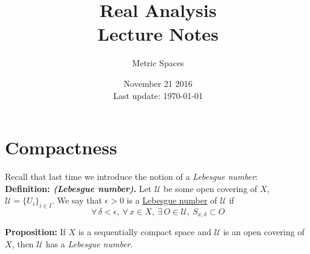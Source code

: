 \documentclass[12pt]{article}
\begin{document}
 
 
\title{Real Analysis\\Lecture Notes}
\author{Metric Spaces}
\date{November 21 2016 \\ Last update: \today{}}
\maketitle

\section{Compactness}

Recall that last time we introduce the notion of a {\em Lebesgue number}: \\

%
%
{\bf Definition: {\em (Lebesgue number)}.} Let $\mathcal U$ be some open covering of $X$, $\mathcal U = \{U_i\}_{i \in I}$. We say that $\epsilon > 0$ is a \underline{Lebesgue number} of $\mathcal U$ if
\begin{equation*}
	\forall\,\delta < \epsilon,~\forall\,x\in X,~\exists\,O\in\mathcal U,~S_{x,\delta} \subset O
\end{equation*}

%
%
{\bf Proposition:} If $X$ is a sequentially compact space and $\mathcal U$ is an open covering of $X$, then $\mathcal U$ has a {\em Lebesgue number}.
\end{document}
